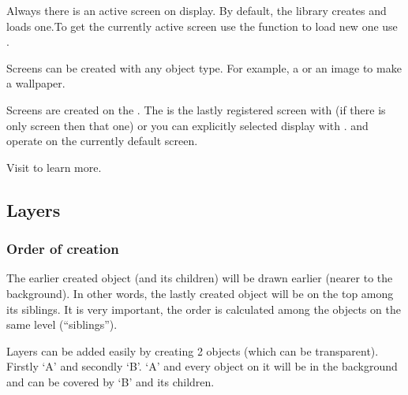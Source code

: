 \documentclass[letterpaper,10pt,english]{sphinxmanual}
\begin{document}
Always there is an active screen on display. By default, the library creates and loads one.To get the currently active screen use the  function to load new one use .

Screens can be created with any object type. For example, a {\hyperref[\detokenize{object-types/obj::doc}]{}} or an image to make a wallpaper.

Screens are created on the .
The  is the lastly registered screen with  (if there is only screen then that one) or you can explicitly selected display with .
 and  operate on the currently default screen.

Visit {\hyperref[\detokenize{overview/display::doc}]{}} to learn more.


\subsection{Layers}
\label{\detokenize{overview/layers:layers}}\label{\detokenize{overview/layers::doc}}

\subsubsection{Order of creation}
\label{\detokenize{overview/layers:order-of-creation}}
The earlier created object (and its children) will be drawn earlier (nearer to the background). In other words, the lastly created object will be on the top among its siblings.
It is very important, the order is calculated among the objects on the same level (“siblings”).

Layers can be added easily by creating 2 objects (which can be transparent). Firstly ‘A’ and secondly ‘B’. ‘A’ and every object on it will be in the background and can be covered by ‘B’ and its children.

\end{document}
